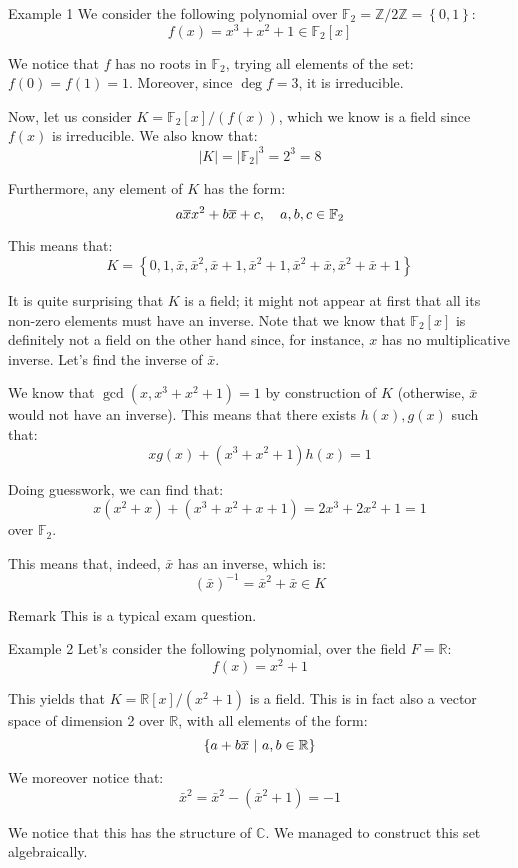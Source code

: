 \documentclass[a4paper]{article}
\begin{document}
\begin{parag}{Example 1}
    We consider the following polynomial over $\mathbb{F}_2 = \mathbb{Z}/2\mathbb{Z} = \left\{0, 1\right\}$: 
    \[f\left(x\right) = x^3 + x^2 + 1 \in \mathbb{F}_2\left[x\right]\]
    
    We notice that $f$ has no roots in $\mathbb{F}_2$, trying all elements of the set: $f\left(0\right) = f\left(1\right) = 1$. Moreover, since $\deg f = 3$, it is irreducible.

    Now, let us consider $K = \mathbb{F}_2\left[x\right] / \left(f\left(x\right)\right)$, which we know is a field since $f\left(x\right)$ is irreducible. We also know that: 
    \[\left|K\right| = \left|\mathbb{F}_2\right|^3 = 2^3 = 8\]
    
    Furthermore, any element of $K$ has the form: 
    \[a\overline{x}x^2 + b \overline{x} + c, \quad a, b, c \in \mathbb{F}_2\]
    
    This means that: 
    \[K = \left\{0, 1, \bar{x}, \bar{x}^2, \bar{x} + 1, \bar{x}^2 + 1, \bar{x}^2 + \bar{x}, \bar{x}^2 + \bar{x} + 1\right\}\]
    
    It is quite surprising that $K$ is a field; it might not appear at first that all its non-zero elements must have an inverse. Note that we know that $\mathbb{F}_2\left[x\right]$ is definitely not a field on the other hand since, for instance, $x$ has no multiplicative inverse. Let's find the inverse of $\bar{x}$. 

    We know that $\gcd\left(x, x^3 + x^2 + 1\right) = 1$ by construction of $K$ (otherwise, $\bar{x}$ would not have an inverse). This means that there exists $h\left(x\right),  g\left(x\right)$ such that: 
    \[x g\left(x\right) + \left(x^3 + x^2 + 1\right)h\left(x\right) = 1\]
    
    Doing guesswork, we can find that: 
    \[x \left(x^2 + x\right) + \left(x^3 + x^2 + x + 1\right) = 2x^3 + 2x^2 + 1 = 1\]
    over $\mathbb{F}_2$.

    This means that, indeed, $\bar{x}$ has an inverse, which is: 
    \[\left(\bar{x}\right)^{-1} = \bar{x}^2 + \bar{x} \in K\]
    
    \begin{subparag}{Remark}
        This is a typical exam question.
    \end{subparag}
\end{parag}

\begin{parag}{Example 2}
    Let's consider the following polynomial, over the field $F = \mathbb{R}$: 
    \[f\left(x\right) = x^2 + 1\]
    
    This yields that $K = \mathbb{R}\left[x\right] / \left(x^2 + 1\right)$ is a field. This is in fact also a vector space of dimension 2 over $\mathbb{R}$, with all elements of the form: 
    \[\left\{a + b \bar{x} \suchthat a, b \in \mathbb{R}\right\}\]
    
    We moreover notice that: 
    \[\bar{x}^2 = \bar{x}^2 - \left(\bar{x}^2 + 1\right) = -1\]
    
    We notice that this has the structure of $\mathbb{C}$. We managed to construct this set algebraically.
\end{parag}
\end{document}
